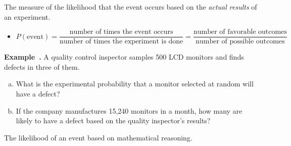 \documentclass{article}
\newcounter{example}[section]
\newenvironment{example}[1][]{\refstepcounter{example}\par\medskip
   {\color{red}\textbf{Example~\theexample. #1}}}{\medskip}
\begin{document}
\begin{tcolorbox}[colframe=black!20!white, opacitybacktitle=0.1, coltitle=black, title=\textbf{Experimental Probability}]
The measure of the likelihood that the event occurs based on the \emph{actual results} of an experiment.

\begin{itemize}
    \item $P(\text{event}) = \dfrac{\text{number of times the event occurs}}{\text{number of times the experiment is done}} = \dfrac{\text{number of favorable outcomes}}{\text{number of possible outcomes}}$
\end{itemize}
\end{tcolorbox}
\bigskip 

\begin{example}
A quality control inspector samples 500 LCD monitors and finds defects in three of them.

\begin{enumerate}[(a)]  \setlength{\itemsep}{0.75in}
    \item What is the experimental probability that a monitor selected at random will have a defect?
    \item If the company manufactures 15,240 monitors in a month, how many are likely to have a defect based on the quality inspector's results?
\end{enumerate}
\end{example}

\vfill 
\newpage 

\begin{tcolorbox}[colframe=black!20!white, opacitybacktitle=0.1, coltitle=black, title=\textbf{Theoretical Probability}]
The likelihood of an event based on mathematical reasoning.
\end{tcolorbox}
\bigskip 
\end{document}
